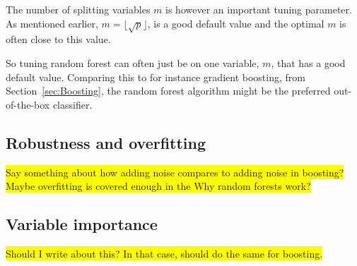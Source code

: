 The number of splitting variables $m$ is however an important tuning parameter. As mentioned earlier, $m = \lfloor \sqrt{p} \rfloor$, is a good default value and the optimal $m$ is often close to this value. 

So tuning random forest can often just be on one variable, $m$, that has a good default value. Comparing this to for instance gradient boosting, from Section~\ref{sec:Boosting}, the random forest algorithm might be the preferred out-of-the-box classifier. 


\subsection{Robustness and overfitting}
\label{sub:Robustness and overfitting}
\colorbox{yellow}{Say something about how adding noise compares to adding noise in boosting?}
\\ \colorbox{yellow}{Maybe overfitting is covered enough in the Why random forests work?}

\subsection{Variable importance}
\label{sub:Variable importance}
\colorbox{yellow}{Should I write about this? In that case, should do the same for boosting.}
